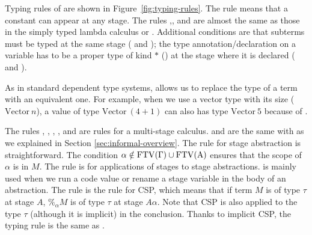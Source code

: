 Typing rules of \LMD are shown in Figure~\ref{fig:typing-rules}.
The rule \TConst{} means that a constant can appear at any stage.
The rules \TVar,\TAbs, and \TApp{} are almost the same as those in the simply typed
lambda calculus or \LLF.  Additional conditions are that subterms must be
typed at the same stage (\TAbs{} and \TApp); the type
annotation/declaration on a variable has to be a proper type of kind
$*$ (\TAbs) at the stage where it is declared (\TVar{} and \TAbs).



As in standard dependent type systems, \TConv{} allows us to replace the type of a term with an equivalent one.
For example, when we use a vector type with its size ($\textrm{Vector}\ n$),
a value of type $\textrm{Vector}\ (4+1)$ can also has type $\textrm{Vector}\ 5$ because of \TConv{}.

The rules \TTB, \TTBL, \TGen, \TIns, and \TCsp{} are rules for a multi-stage calculus.
\TTB and \TTBL are the same with \LTP as we explained in Section \ref{sec:informal-overview}.
The rule \TGen{} for stage abstraction is straightforward.
The condition $\alpha\notin\rm{FTV}(\Gamma)\cup\rm{FTV}(A)$ ensures that the scope of $\alpha$ is in $M$.
The rule \TIns{} is for applications of stages to stage abstractions.
\TIns{} is mainly used when we run a code value or rename a stage variable in the body of an abstraction.
The rule \TCsp{} is the rule for CSP, which means that
if term $M$ is of type $\tau$ at stage $A$, $\%_\alpha M$ is of type $\tau$ at stage $A\alpha$.
Note that CSP is also applied to the type \(\tau\) (although it is implicit) in the conclusion.  Thanks to implicit CSP, the typing rule is the same as \LTP.


